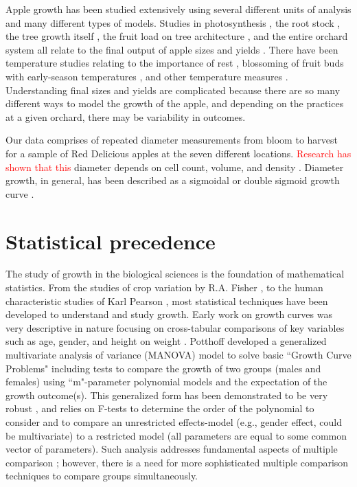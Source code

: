 \documentclass[useAMS]{cJAS2e}
\newcommand{\changed}[1]{\textcolor{red}{#1}}
\begin{document}
 Apple growth has been studied extensively using several different units of analysis and many different types of models.  Studies in photosynthesis \citep{Blanke:1992}, the root stock \citep{Abbott:1960,Zeller:1991,Pawlicki:1995,Kelner:2000}, the tree growth itself \citep{Seems:1986}, the fruit load on tree architecture \citep{Kelner:2000,Costes:2006}, and the entire orchard system \citep{Hester:2003} all relate to the final output of apple sizes and yields \citep{Welte:1990}.   There have been temperature studies \citep{Johnson:1986} relating to the importance of rest \citep{Champagnat:1989,Cook:2005}, blossoming \citep{Fulford:1966a,Fulford:1966b} of fruit buds \citep{Landsberg:1974} with early-season temperatures \citep{Austin:1999}, and other temperature measures \citep{Tromp:1994}.  Understanding final sizes and yields are complicated because there are so many different ways to model the growth of the apple, and depending on the practices at a given orchard, there may be variability in outcomes.

Our data comprises of repeated diameter measurements from bloom to harvest for a sample of Red Delicious apples at the seven different locations. \changed{Research has shown that this} diameter depends on cell count, volume, and density \citep{Coombe:1976,Wu:1999}.  Diameter growth, in general, has been described as a sigmoidal or double sigmoid growth curve \citep{Lakso:1995}.

\section{Statistical precedence}\label{sec:sbg}
The study of growth in the biological sciences is the foundation of mathematical statistics.  From the studies of crop variation by R.A. Fisher \citep*{Fisher:1963}, to the human characteristic studies of Karl Pearson \citep{Pearson:1902,Pearson:1906}, most statistical techniques have been developed to understand and study growth. Early work on growth curves was very descriptive in nature focusing on cross-tabular comparisons of key variables such as age, gender, and height on weight \citep{Hacker:1944}.   Potthoff \citet{Potthoff:1964} developed a generalized multivariate analysis of variance (MANOVA) model to solve basic ``Growth Curve Problems" including tests to compare the growth of two groups (males and females) using ``m"-parameter polynomial models and the expectation of the growth outcome(s).  This generalized form has been demonstrated to be very robust \citep{Potthoff:1964,Rao:1965,Lee:1974,Baksalary:1978,Verbyla:1986,Verbyla:1988,Fujikoshi:1991}, and relies on F-tests to determine the order of the polynomial to consider and to compare an unrestricted effects-model (e.g., gender effect, could be multivariate) to a restricted model (all parameters are equal to some common vector of parameters).  Such analysis addresses fundamental aspects of multiple comparison \citep{ONeill:1971,Einot:1975,Hsu:1996}; however, there is a need for more sophisticated multiple comparison techniques to compare groups simultaneously.
\end{document}
